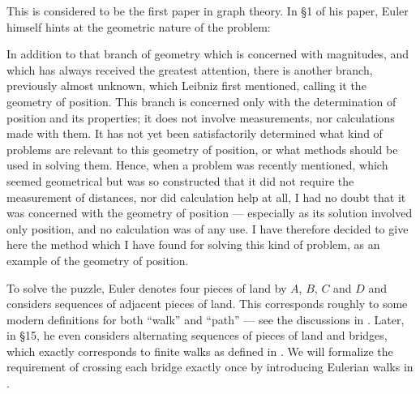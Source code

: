 \begin{example}
  This is considered to be the first paper in graph theory. In \S 1 of his paper, Euler himself hints at the geometric nature of the problem:
  \begin{displayquote}
    In addition to that branch of geometry which is concerned with magnitudes, and which has always received the greatest attention, there is another branch, previously almost unknown, which Leibniz first mentioned, calling it the geometry of position. This branch is concerned only with the determination of position and its properties; it does not involve measurements, nor calculations made with them. It has not yet been satisfactorily determined what kind of problems are relevant to this geometry of position, or what methods should be used in solving them. Hence, when a problem was recently mentioned, which seemed geometrical but was so constructed that it did not require the measurement of distances, nor did calculation help at all, I had no doubt that it was concerned with the geometry of position --- especially as its solution involved only position, and no calculation was of any use. I have therefore decided to give here the method which I have found for solving this kind of problem, as an example of the geometry of position.
  \end{displayquote}

  To solve the puzzle, Euler denotes four pieces of land by \( A \), \( B \), \( C \) and \( D \) and considers sequences of adjacent pieces of land. This corresponds roughly to some modern definitions for both \enquote{walk} and \enquote{path} --- see the discussions in . Later, in \S 15, he even considers alternating sequences of pieces of land and bridges, which exactly corresponds to finite walks as defined in . We will formalize the requirement of crossing each bridge exactly once by introducing Eulerian walks in .


\end{example}
